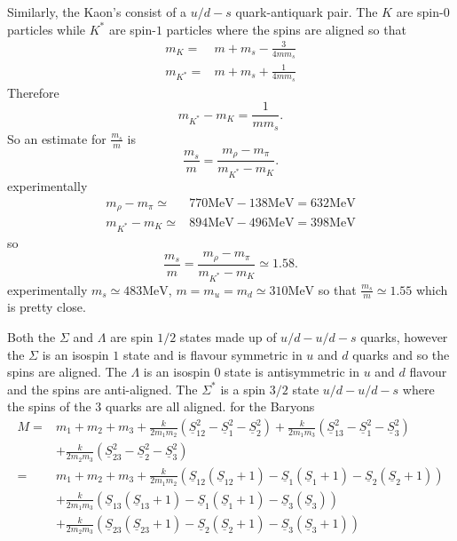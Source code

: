 \documentclass[main.tex]{subfiles}
\begin{document}
Similarly, the Kaon's consist of a $u/d-s$ quark-antiquark pair. The $K$ are spin-$0$ particles while $K^*$ are spin-$1$ particles where the spins are aligned so that
\begin{align}
m_{K}=&m+m_s-\frac{3}{4mm_s}\\
m_{K^*}=&m+m_s+\frac{1}{4mm_s}
\end{align}
Therefore
\begin{equation}
m_{K^*}-m_{K}=\frac{1}{mm_s}.
\end{equation}
So an estimate for $\frac{m_s}{m}$ is
\begin{equation}
\frac{m_s}{m}=\frac{m_{\rho}-m_{\pi}}{m_{K^*}-m_{K}}.
\end{equation}
experimentally
\begin{align}
m_{\rho}-m_{\pi}\simeq&770\text{MeV}-138\text{MeV}=632\text{MeV}\\
m_{K^*}-m_{K}\simeq&894\text{MeV}-496\text{MeV}=398\text{MeV}
\end{align}
so
\begin{equation}
\frac{m_s}{m}=\frac{m_{\rho}-m_{\pi}}{m_{K^*}-m_{K}}\simeq1.58.
\end{equation}
experimentally $m_s\simeq483\text{MeV}$, $m=m_u=m_d\simeq310\text{MeV}$ so that $\frac{m_s}{m}\simeq1.55$ which is pretty close.

Both the $\Sigma$ and $\Lambda$ are spin $1/2$ states made up of $u/d-u/d-s$ quarks, however the $\Sigma$ is an isospin $1$ state and is flavour symmetric in $u$ and $d$ quarks and so the spins are aligned. The $\Lambda$ is an isospin $0$ state is antisymmetric in $u$ and $d$ flavour and the spins are anti-aligned. The $\Sigma^*$ is a spin $3/2$ state $u/d-u/d-s$ where the spins of the 3 quarks are all aligned.
for the Baryons
\begin{align}
M=&m_1+m_2+m_3+\frac{k}{2m_1m_2}\left(\underline{S}_{12}^2-\underline{S}_1^2-\underline{S}_2^2\right)+\frac{k}{2m_1m_3}\left(\underline{S}_{13}^2-\underline{S}_1^2-\underline{S}_3^2\right)\nonumber\\
&+\frac{k}{2m_2m_3}\left(\underline{S}_{23}^2-\underline{S}_2^2-\underline{S}_3^2\right)\\
=&m_1+m_2+m_3+\frac{k}{2m_1m_2}\left(\underline{S}_{12}(\underline{S}_{12}+1)-\underline{S}_1(\underline{S}_1+1)-\underline{S}_2(\underline{S}_2+1)\right)\nonumber\\
&+\frac{k}{2m_1m_3}\left(\underline{S}_{13}(\underline{S}_{13}+1)-\underline{S}_1(\underline{S}_1+1)-\underline{S}_3(\underline{S}_3)\right)\\
&+\frac{k}{2m_2m_3}\left(\underline{S}_{23}(\underline{S}_{23}+1)-\underline{S}_2(\underline{S}_2+1)-\underline{S}_3(\underline{S}_3+1)\right)\nonumber
\end{align}
\end{document}
